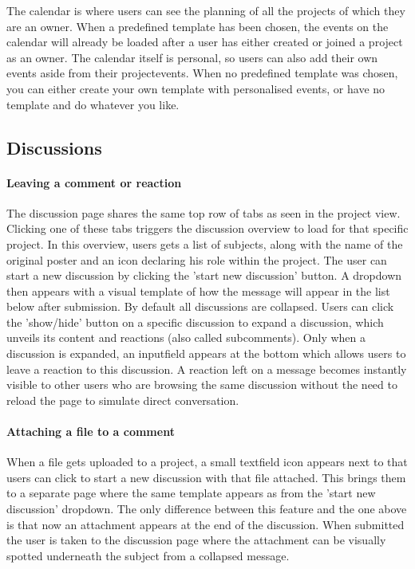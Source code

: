 The calendar is where users can see the planning of all the projects of which they are an owner.
When a predefined template has been chosen, the events on the calendar will already be loaded after
a user has either created or joined a project as an owner. The calendar itself is personal, so users can also add their own events aside from their projectevents. When no predefined template was chosen, you can either
create your own template with personalised events, or have no template and do whatever you like.

\subsection{Discussions}

\paragraph{Leaving a comment or reaction}

The discussion page shares the same top row of tabs as seen in the project view. Clicking one of these tabs
triggers the discussion overview to load for that specific project. In this overview, users gets a
list of subjects, along with the name of the original poster and an icon declaring his role within the project. The user can start a new discussion by clicking the 'start new discussion' button. A dropdown 
then appears with a visual template of how the message will appear in the list below after submission. By default all discussions are collapsed. Users can click the 'show/hide' button on a specific discussion to 
expand a discussion, which unveils its content and reactions (also called subcomments). 
Only when a discussion is expanded, an inputfield appears at the bottom which allows users to leave a reaction to this discussion. 
A reaction left on a message becomes instantly visible to other users who are browsing the same discussion without the need to reload the page to simulate direct conversation.

\paragraph{Attaching a file to a comment}

When a file gets uploaded to a project, a small textfield icon appears next to that users can click to start
a new discussion with that file attached. This brings them to a separate page where the same template appears
as from the 'start new discussion' dropdown. The only difference between this feature and the one above is that now an attachment appears at the end of the discussion. 
When submitted the user is taken to the discussion page where the attachment can be visually spotted underneath the subject from a collapsed message.

